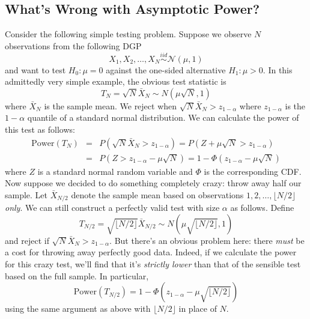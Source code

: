 \documentclass[12pt]{article}
\theoremstyle{definition}
\begin{document}
\subsection{What's Wrong with Asymptotic Power?}
Consider the following simple testing problem. Suppose we observe $N$ observations from the following DGP
$$X_1, X_2, \hdots, X_{N} \overset{iid}{\sim} \mathcal{N}(\mu, 1)$$
and want to test $H_0\colon \mu = 0$ against the one-sided alternative $H_1\colon \mu >0$. In this admittedly very simple example, the obvious test statistic is
$$T_{N} = \sqrt{N} \bar{X}_{N} \sim N\left(\mu \sqrt{N}, 1\right)$$
where $\bar{X}_{N}$ is the sample mean. We reject when $\sqrt{N} \bar{X}_{N}>z_{1-\alpha}$ where $z_{1-\alpha}$ is the $1-\alpha$ quantile of a standard normal distribution. We can calculate the power of this test as follows:
\begin{eqnarray*}
\mbox{Power}(T_{N}) &=& P\left(\sqrt{N} \bar{X}_{N}>z_{1-\alpha}\right) = P\left(Z + \mu\sqrt{N} >z_{1-\alpha}\right)\\
&=&P\left(Z >z_{1-\alpha} - \mu\sqrt{N}\right) = 1 - \Phi\left(z_{1-\alpha} - \mu\sqrt{N}\right)
\end{eqnarray*}
where $Z$ is a standard normal random variable and $\Phi$ is the corresponding CDF. Now suppose we decided to do something completely crazy: throw away half our sample. Let $\bar{X}_{N/2}$ denote the sample mean based on observations $1, 2, \hdots, \lfloor N/2 \rfloor $ \emph{only}. We can still construct a perfectly valid test with size $\alpha$ as follows. Define
$$T_{N/2} = \sqrt{\lfloor N/2 \rfloor } \bar{X}_{N/2} \sim N\left(\mu \sqrt{\lfloor N/2 \rfloor }, 1\right)$$
and reject if $\sqrt{N} \bar{X}_N > z_{1-\alpha}$. But there's an obvious problem here: there \emph{must} be a cost for throwing away perfectly good data. Indeed, if we calculate the power for this crazy test, we'll find that it's \emph{strictly lower} than that of the sensible test based on the full sample. In particular,
$$\mbox{Power}(T_{N/2}) = 1 - \Phi\left(z_{1-\alpha} - \mu\sqrt{\lfloor N/2 \rfloor }\right)$$
using the same argument as above with $\lfloor N/2 \rfloor $ in place of $N$.
\end{document}
